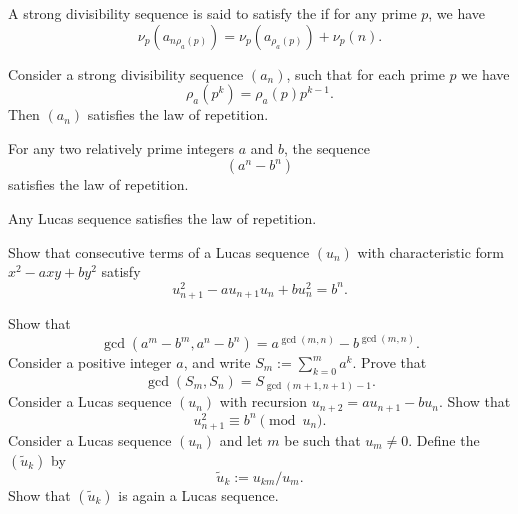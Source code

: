 \begin{definition}
  A strong divisibility sequence is said to satisfy the  if for any prime $p$, we have
  \begin{equation*}
    \nu_p(a_{n\rho_a(p)})=\nu_p(a_{\rho_a(p)})+\nu_p(n).
  \end{equation*}
\end{definition}

\begin{theorem}
  Consider a strong divisibility sequence $(a_n)$, such that for each prime $p$ we have
  \begin{equation*}
    \rho_a(p^k)=\rho_a(p)p^{k-1}.
  \end{equation*}
  Then $(a_n)$ satisfies the law of repetition.
\end{theorem}

\begin{example}
  For any two relatively prime integers $a$ and $b$, the sequence
  \begin{equation*}
    (a^n-b^n)
  \end{equation*}
  satisfies the law of repetition.
\end{example}

\begin{example}
  Any Lucas sequence satisfies the law of repetition.
\end{example}

\exercises

\begin{starter}
  \exercise Show that consecutive terms of a Lucas sequence $(u_n)$ with characteristic form $x^2-axy+by^2$ satisfy
  \begin{equation*}
    u_{n+1}^2-au_{n+1}u_n+bu_n^2=b^n.
  \end{equation*}
\end{starter}

\begin{routine}
    \exercise Show that
  \begin{equation*}
    \gcd(a^m-b^m,a^n-b^n)=a^{\gcd(m,n)}-b^{\gcd(m,n)}.
  \end{equation*}
  \exercise Consider a positive integer $a$, and write $S_m:=\sum_{k=0}^m a^k$. Prove that
  \begin{equation*}
    \gcd(S_m,S_n)=S_{\gcd(m+1,n+1)-1}.
  \end{equation*}
  \exercise Consider a Lucas sequence $(u_n)$ with recursion $u_{n+2}=au_{n+1}-bu_n$. Show that
  \begin{equation*}
    u_{n+1}^2\equiv b^n\pmod{u_n}.
  \end{equation*}
  \exercise Consider a Lucas sequence $(u_n)$ and let $m$ be such that $u_m\neq 0$. Define the  $(\tilde{u}_k)$ by
  \begin{equation*}
    \tilde{u}_k:=u_{km}/u_m.
  \end{equation*}
  Show that $(\tilde{u}_k)$ is again a Lucas sequence.
\end{routine}

